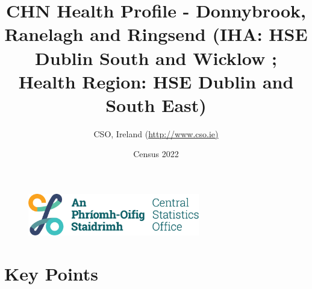\documentclass{article}
\title{CHN Health Profile - Donnybrook, Ranelagh and Ringsend (IHA: HSE Dublin South and Wicklow ;  Health Region: HSE Dublin and South East) }
\date{Census 2022}
\author{CSO, Ireland  (\url{http://www.cso.ie)}}
\begin{document}


\begin{figure}
	\centering
\includegraphics[width =75mm]{../figures/CSO_Logo.png}
\end{figure}

				 
		   
						  
														  
																																													
												 
			 
\maketitle
					
													   
				 
						 
																																																																											   
				 
				  
  \pagebreak
    	    \tableofcontents

\pagebreak


\section{Key Points}
\end{document}
